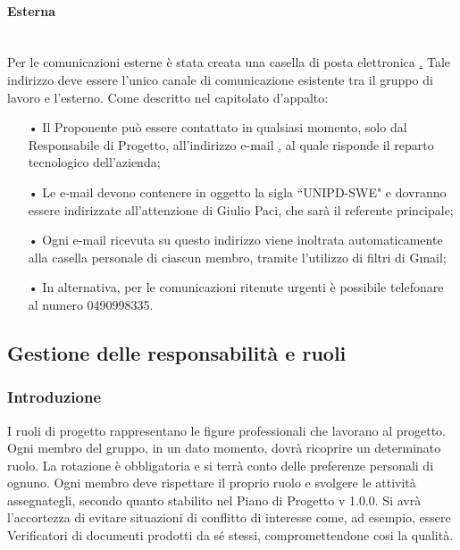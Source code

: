 \paragraph{Esterna}\mbox{}\\
Per le comunicazioni esterne è stata creata una casella di posta elettronica \href{SWEight@gmail.com}.
\newline 
Tale indirizzo deve essere l'unico canale di comunicazione esistente tra il gruppo di lavoro e l'esterno. 
\newline
Come descritto nel capitolato d'appalto: 
\begin{itemize}
\item[•] Il Proponente può essere contattato in qualsiasi momento, solo dal Responsabile di Progetto, all'indirizzo e-mail \href{tech@mivoq.it} , al quale risponde il reparto tecnologico dell'azienda;
\item[•] Le e-mail devono contenere in oggetto la sigla “UNIPD-SWE" e dovranno essere indirizzate all'attenzione di Giulio Paci, che sarà il referente principale;
\item[•] Ogni e-mail ricevuta su questo indirizzo viene inoltrata automaticamente alla casella personale di ciascun membro, tramite l'utilizzo di filtri di Gmail;
\item[•] In alternativa, per le comunicazioni ritenute urgenti è possibile telefonare al numero 0490998335.
\end{itemize}

\subsection{Gestione delle responsabilità e ruoli}

\subsubsection{Introduzione}
I ruoli di progetto rappresentano le figure professionali che lavorano al progetto. Ogni membro del gruppo, in un dato momento, dovrà ricoprire un determinato ruolo.  
\newline
La rotazione è obbligatoria e si terrà conto delle preferenze personali di ognuno. Ogni membro deve rispettare il proprio ruolo e svolgere le attività assegnategli, secondo quanto stabilito nel Piano di Progetto v 1.0.0. Si avrà l'accortezza di evitare situazioni di conflitto di interesse come, ad esempio, essere Verificatori di documenti prodotti da sé stessi, compromettendone cosi la qualità.

